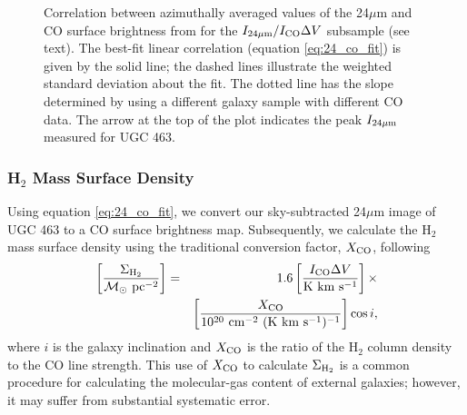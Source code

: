 \documentclass[apj,iop,numberedappendix]{emulateapj}
\begin{document}
\begin{figure}
\caption{
%
Correlation between azimuthally averaged values of the 24$\mu$m and CO surface
brightness from  for the $I_{24\mu{\rm m}}/I_{\rm CO}\Delta V$ subsample
(see text).  The best-fit linear correlation (equation \ref{eq:24_co_fit}) is
given by the solid line; the dashed lines illustrate the weighted standard
deviation about the fit.  The dotted line has the slope determined by
\citet{2006A&A...456..847P} using a different galaxy sample with different CO
data.  The arrow at the top of the plot indicates the peak $I_{24\mu{\rm m}}$ measured for
UGC 463.
%
}
\label{fig:cocal}
\end{figure}

\subsubsection{H$_2$ Mass Surface Density}
\label{sec:xco}

Using equation \ref{eq:24_co_fit}, we convert our sky-subtracted 24$\mu$m image
of UGC 463 to a CO surface brightness map.  Subsequently, we calculate the H$_2$
mass surface density using the traditional conversion factor, $X_{\rm CO}$, following
%
\begin{eqnarray}
%
\left[\frac{\sdmh}{\msol\ {\rm pc}^{-2}}\right] & = & 1.6 \left[\frac{\ico}{\rm K\
km\ s^{-1}}\right] \times \nonumber \\
 & & \left[\frac{\xco}{\rm 10^{20}\ cm^{-2}\ (K\ km\
s^{-1})^{-1}}\right] \cos i,
%
\label{eq:sdh2}
%
\end{eqnarray}
%
where $i$ is the galaxy inclination and $X_{\rm CO}$ is the ratio of the H$_2$ column
density to the CO line strength.  This use of $X_{\rm CO}$ to calculate $\Sigma_{\rm H_2}$ is a
common procedure for calculating the molecular-gas content of external galaxies;
however, it may suffer from substantial systematic error.
\end{document}
